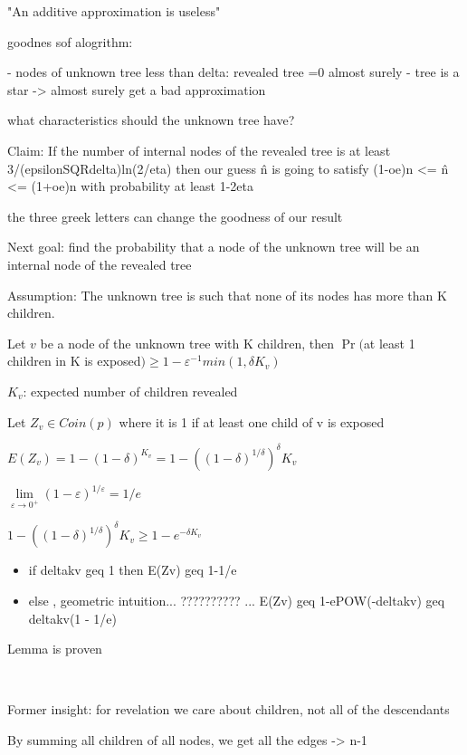 \documentclass{report}
\begin{document}
	
	
	"An additive approximation is useless"
	
	
	goodnes sof alogrithm:
	
	 - nodes of unknown tree less than delta: revealed tree =0 almost surely
	 - tree is a star -> almost surely get a bad approximation
	 
	what characteristics should the unknown tree have?
	
	Claim: If the number of internal nodes of the revealed tree is at least 3/(epsilonSQRdelta)ln(2/eta) then our guess \^n is going to satisfy (1-oe)n <= \^n <= (1+oe)n with probability at least 1-2eta
	
	the three greek letters can change the goodness of our result
	
	Next goal: find the probability that a node of the unknown tree will be an internal node of the revealed tree
	
	Assumption: The unknown tree is such that none of its nodes has more than K children.
	
	Let $v$ be a node of the unknown tree with K children, then $\Pr($at least 1 children in K is exposed$) \geq 1-\varepsilon^{-1}min(1, \delta K_v)$
	
	$K_v$: expected number of children revealed
	
	Let $Z_v \in Coin(p)$ where it is 1 if at least one child of v is exposed
	
	$\displaystyle E(Z_v) = 1 - (1 - \delta)^{K_v} = 1 - ((1 - \delta)^{1/\delta})^\delta{K_v}$
	
	$\lim\limits_{\varepsilon \to 0^+}(1-\varepsilon)^{1/\varepsilon} = 1/e$
	
	$1 - ((1 - \delta)^{1/\delta})^\delta{K_v} \geq 1- e^{-\delta K_v}$
	
	
	\begin{itemize}
		\item if deltakv geq 1 then E(Zv) geq 1-1/e
		\item else , geometric intuition... ?????????? ... E(Zv) geq 1-ePOW(-deltakv) geq deltakv(1 - 1/e)
	\end{itemize}
	Lemma is proven
	
	
	\
	
	Former insight: for revelation we care about children, not all of the descendants
	
	By summing all children of all nodes, we get all the edges -> n-1
	
\end{document}
